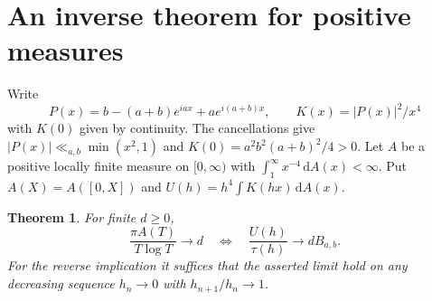 \documentclass[11pt]{article}
\newtheorem{theorem}{Theorem}[section]
\newcommand{\dd}{\,\mathrm d}
\begin{document}
\section{An inverse theorem for positive measures}
Write
\[
 P(x)=b-(a+b)e^{iax}+ae^{i(a+b)x},\qquad K(x)=|P(x)|^2/x^4
\]
with $K(0)$ given by continuity. The cancellations give $|P(x)|\ll_{a,b}\min(x^2,1)$ and $K(0)=a^2b^2(a+b)^2/4>0$. Let $A$ be a positive locally finite measure on $[0,\infty)$ with $\int_1^\infty x^{-4}\dd A(x)<\infty$. Put $A(X)=A([0,X])$ and $U(h)=h^4\int K(hx)\dd A(x)$.

\begin{theorem}\label{th:inverse}
For finite $d\ge0$,
\[
 \frac{\pi A(T)}{T\log T}\longrightarrow d
 \quad\Longleftrightarrow\quad
 \frac{U(h)}{\tau(h)}\longrightarrow d B_{a,b}.
\]
For the reverse implication it suffices that the asserted limit hold on any decreasing sequence $h_n\to0$ with $h_{n+1}/h_n\to1$.
\end{theorem}
\end{document}
